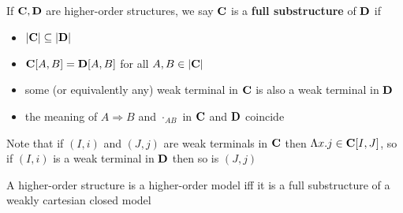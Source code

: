 \documentclass[11pt]{article}
\begin{document}
If \(\operatorname{\textbf{C}},\operatorname{\textbf{D}}\) are higher-order structures, we say \(\operatorname{\textbf{C}}\) is a \textbf{full substructure} of \(\operatorname{\textbf{D}}\) if
\begin{itemize}
\item \(\abs{\bC}\subseteq\abs{\bD}\)
\item \(\operatorname{\textbf{C}}[A,B]=\operatorname{\textbf{D}}[A,B]\) for all \(A,B\in\abs{\bC}\)
\item some (or equivalently any) weak terminal in \(\operatorname{\textbf{C}}\) is also a weak terminal in \(\operatorname{\textbf{D}}\)
\item the meaning of \(A\Rightarrow B\) and \(\cdot_{AB}\) in \(\operatorname{\textbf{C}}\) and \(\operatorname{\textbf{D}}\) coincide
\end{itemize}


Note that if \((I,i)\) and \((J,j)\) are weak terminals in \(\operatorname{\textbf{C}}\) then \(\Lambda x.j\in\operatorname{\textbf{C}}[I,J]\), so
if \((I,i)\) is a weak terminal in \(\operatorname{\textbf{D}}\) then so is \((J,j)\)

\begin{theorem}[]
A higher-order structure is a higher-order model iff it is a full substructure of a weakly
cartesian closed model
\end{theorem}
\end{document}
